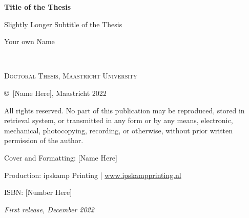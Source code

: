 \newpage

\begingroup
\thispagestyle{empty}
\centering
\vspace*{3cm}
\normalfont\fontsize{42}{35}\sffamily\selectfont
\color{offBlack}\textbf{Title of the Thesis} %

\normalfont\fontsize{18}{18}\sffamily\selectfont
\color{offBlack}Slightly Longer Subtitle of the Thesis

\vspace*{0.5cm}


\vspace*{0.5cm}
{\small Your own Name}\par %
\vspace{-1.25em}
\endgroup

\newpage
~\vfill
\thispagestyle{empty}

\noindent \textsc{Doctoral Thesis, Maastricht University}

\noindent \copyright\ [Name Here], Maastricht 2022 %

\noindent All rights reserved. No part of this publication may be reproduced, stored in retrieval system, or transmitted in any form or by any means, electronic, mechanical, photocopying, recording, or otherwise, without prior written permission of the author.

\begin{footnotesize}

\noindent Cover and Formatting: [Name Here]
\vspace{-1em}

\noindent Production: ipskamp Printing | \color{offBlack!70}\url{www.ipskampprinting.nl}\color{black}


\noindent ISBN: [Number Here]

\noindent \textit{First release, December 2022} %

\end{footnotesize}


